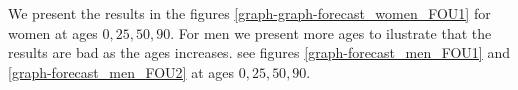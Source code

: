 \documentclass[smallextended]{svjour3}
\begin{document}
        We present the results in the figures 
    \ref{graph-graph-forecast_women_FOU1} for women at ages 
    $\num{0},
     \num{25},
     \num{50},
     \num{90}
    $. For men we present more ages to ilustrate that the
    results are bad as the ages increases. see figures
    \ref{graph-forecast_men_FOU1} and \ref{graph-forecast_men_FOU2} at ages
    $
        \num{0},
        \num{25},
        \num{50},
        \num{90}
    $.


\end{document}
